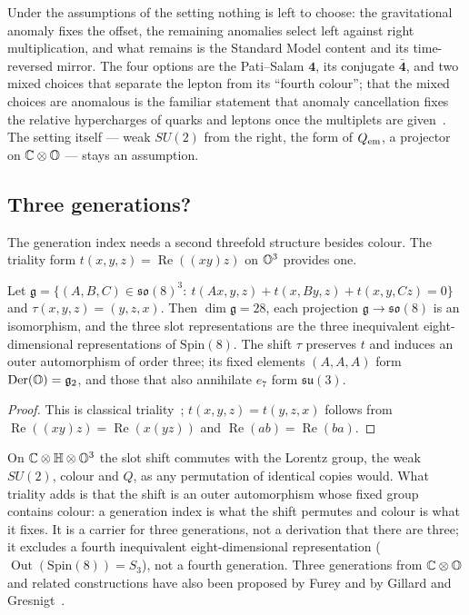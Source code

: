 Under the assumptions of the setting nothing is left to choose: the gravitational anomaly fixes the offset, the remaining anomalies
select left against right multiplication, and what remains is the Standard Model content and its time-reversed mirror.  The four options
are the Pati--Salam \(\mathbf4\), its conjugate \(\bar{\mathbf4}\), and two mixed choices that separate the lepton from its ``fourth colour''; that
the mixed choices are anomalous is the familiar statement that anomaly cancellation fixes the relative hypercharges of quarks and leptons
once the multiplets are given~\cite{gengmarshak,minahan}.  The setting itself --- weak \(SU(2)\) from the right, the form of \(Q_{\rm em}\), a
projector on \(\mathbb C\otimes\mathbb O\) --- stays an assumption.

\subsection{Three generations?}

The generation index needs a second threefold structure besides colour.  The triality form \(t(x,y,z)=\operatorname{Re}((xy)z)\) on \(\mathbb O^3\)
provides one.

\begin{proposition}[Triality]\label{prop:triality}
Let \(\mathfrak g=\{(A,B,C)\in\mathfrak{so}(8)^3:\ t(Ax,y,z)+t(x,By,z)+t(x,y,Cz)=0\}\) and \(\tau(x,y,z)=(y,z,x)\).  Then \(\dim\mathfrak g=28\), each
projection \(\mathfrak g\to\mathfrak{so}(8)\) is an isomorphism, and the three slot representations are the three inequivalent
eight-dimensional representations of \(\mathrm{Spin}(8)\).  The shift \(\tau\) preserves \(t\) and induces an outer automorphism of order three;
its fixed elements \((A,A,A)\) form \(\operatorname{Der}(\mathbb O)=\mathfrak g_2\), and those that also annihilate \(e_7\) form \(\mathfrak{su}(3)\).
\end{proposition}

\begin{proof}
This is classical triality~\cite{baez}; \(t(x,y,z)=t(y,z,x)\) follows from \(\operatorname{Re}((xy)z)=\operatorname{Re}(x(yz))\) and
\(\operatorname{Re}(ab)=\operatorname{Re}(ba)\).
\end{proof}

On \(\mathbb C\otimes\mathbb H\otimes\mathbb O^3\) the slot shift commutes with the Lorentz group, the weak \(SU(2)\), colour and \(Q\), as any permutation
of identical copies would.  What triality adds is that the shift is an outer automorphism whose fixed group contains colour: a
generation index is what the shift permutes and colour is what it fixes.  It is a carrier for three
generations, not a derivation that there are three; it excludes a fourth inequivalent eight-dimensional representation
(\(\operatorname{Out}(\mathrm{Spin}(8))=S_3\)), not a fourth generation.  Three generations from \(\mathbb C\otimes\mathbb O\) and related
constructions have also been proposed by Furey and by Gillard and Gresnigt~\cite{fureygen,gillard}.

